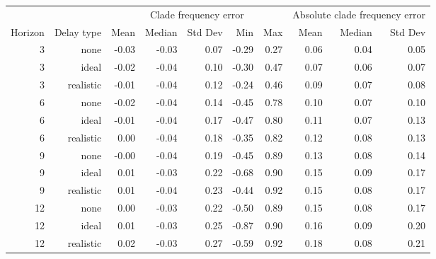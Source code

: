 
\begin{tabular*}{1.0\textwidth}{rrrrrrrrrr}
\toprule
        &            & \multicolumn{5}{c}{Clade frequency error} & \multicolumn{3}{c}{Absolute clade frequency error} \\
Horizon & Delay type & Mean & Median & Std Dev & Min & Max & Mean & Median & Std Dev \\
\midrule

3 & none & -0.03 & -0.03 & 0.07 & -0.29 & 0.27 & 0.06 & 0.04 & 0.05 \\
3 & ideal & -0.02 & -0.04 & 0.10 & -0.30 & 0.47 & 0.07 & 0.06 & 0.07 \\
3 & realistic & -0.01 & -0.04 & 0.12 & -0.24 & 0.46 & 0.09 & 0.07 & 0.08 \\
6 & none & -0.02 & -0.04 & 0.14 & -0.45 & 0.78 & 0.10 & 0.07 & 0.10 \\
6 & ideal & -0.01 & -0.04 & 0.17 & -0.47 & 0.80 & 0.11 & 0.07 & 0.13 \\
6 & realistic & 0.00 & -0.04 & 0.18 & -0.35 & 0.82 & 0.12 & 0.08 & 0.13 \\
9 & none & -0.00 & -0.04 & 0.19 & -0.45 & 0.89 & 0.13 & 0.08 & 0.14 \\
9 & ideal & 0.01 & -0.03 & 0.22 & -0.68 & 0.90 & 0.15 & 0.09 & 0.17 \\
9 & realistic & 0.01 & -0.04 & 0.23 & -0.44 & 0.92 & 0.15 & 0.08 & 0.17 \\
12 & none & 0.00 & -0.03 & 0.22 & -0.50 & 0.89 & 0.15 & 0.08 & 0.17 \\
12 & ideal & 0.01 & -0.03 & 0.25 & -0.87 & 0.90 & 0.16 & 0.09 & 0.20 \\
12 & realistic & 0.02 & -0.03 & 0.27 & -0.59 & 0.92 & 0.18 & 0.08 & 0.21 \\

\bottomrule
\end{tabular*}

